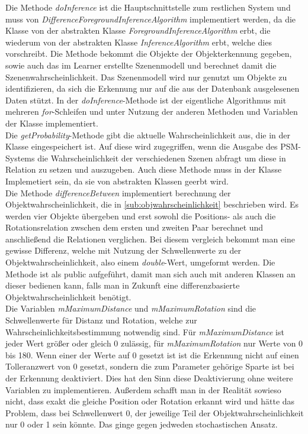 Die Methode \textit{doInference} ist die Hauptschnittstelle zum restlichen System und muss von \textit{DifferenceForegroundInferenceAlgorithm} implementiert werden, da die Klasse von der abstrakten Klasse \textit{ForegroundInferenceAlgorithm} erbt, die wiederum von der abstrakten Klasse \textit{InferenceAlgorithm} erbt, welche dies vorschreibt. Die Methode bekommt die Objekte der Objekterkennung gegeben, sowie auch das im Learner erstellte Szenenmodell und berechnet damit die Szenenwahrscheinlichkeit. Das Szenenmodell wird nur genutzt um Objekte zu identifizieren, da sich die Erkennung nur auf die aus der Datenbank ausgelesenen Daten stützt. In der \textit{doInference}-Methode ist der eigentliche Algorithmus mit mehreren \textit{for}-Schleifen und unter Nutzung der anderen Methoden und Variablen der Klasse  implementiert.\smallskip\\
Die \textit{getProbability}-Methode gibt die aktuelle Wahrscheinlichkeit aus, die in der Klasse eingespeichert ist. Auf diese wird zugegriffen, wenn die Ausgabe des PSM-Systems die Wahrscheinlichkeit der verschiedenen Szenen abfragt um diese in Relation zu setzen und auszugeben. Auch diese Methode muss in der Klasse Implemetiert sein, da sie von abstrakten Klassen geerbt wird.\smallskip\\
Die Methode \textit{differenceBetween} implementiert berechnung der Objektwahrscheinlichkeit, die in \ref{sub:objwahrscheinlichkeit} beschrieben wird. Es werden vier Objekte übergeben und erst sowohl die Positions- als auch die Rotationsrelation zwschen dem ersten und zweiten Paar berechnet und anschließend die Relationen verglichen. Bei diesem vergleich bekommt man eine gewisse Differenz, welche mit Nutzung der Schwellenwerte zu der Objektwahrscheinlichkeit, also einem \textit{double}-Wert, umgeformt werden. Die Methode ist als public aufgeführt, damit man sich auch mit anderen Klassen an dieser bedienen kann, falls man in Zukunft eine differenzbasierte Objektwahrscheinlichkeit benötigt. \smallskip\\
Die Variablen \textit{mMaximumDistance} und \textit{mMaximumRotation} sind die Schwellenwerte für Distanz und Rotation, welche zur Wahrscheinlichkeitsbestimmung notwendig sind. Für \textit{mMaximumDistance} ist jeder Wert größer oder gleich 0 zulässig, für \textit{mMaximumRotation} nur Werte von 0 bis 180. Wenn einer der Werte auf 0 gesetzt ist ist die Erkennung nicht auf einen Tolleranzwert von 0 gesetzt, sondern die zum Parameter gehörige Sparte ist bei der Erkennung deaktiviert. Dies hat den Sinn diese Deaktivierung ohne weitere Variablen zu implementieren. Außerdem schafft man in der Realität sowieso nicht, dass exakt die gleiche Position oder Rotation erkannt wird und hätte das Problem, dass bei Schwellenwert 0, der jeweilige Teil der Objektwahrscheinlichkeit nur 0 oder 1 sein könnte. Das ginge gegen jedweden stochastischen Ansatz.\smallskip\\
